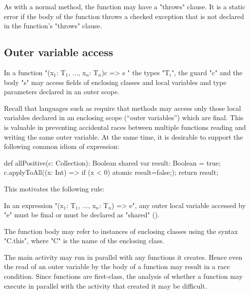 As with a normal method, the function may have a \xcd"throws"
clause. It is a static error if the body of the function throws a
checked exception that is not declared in the function's \xcd"throws"
clause.

\subsection{Outer variable access}

In a function
\xcdmath"(x$_1$: T$_1$, $\dots$, x$_n$: T$_n$){c} => { s }"
the types \xcdmath"T$_i$", the guard \xcd"c" and the body \xcd"s"
may access fields of enclosing classes and local variables and type
parameters declared in an outer scope.

Recall that languages such as \java{} require that methods may
access only those local variables declared in an enclosing scope
(``outer variables'') which are final. This is valuable in
preventing accidental races between multiple functions reading
and writing the same outer variable. At the same time, it is
desirable to support the following common idiom of expression:

\begin{xten}
def allPositive(c: Collection): Boolean {
  shared var result: Boolean = true;
  c.applyToAll((x: Int) => { if (x < 0) atomic {result=false;}});
  return result;
}
\end{xten}

This motivates the following rule:

\begin{staticrule*}
In an expression
\xcdmath"(x$_1$: T$_1$, $\dots$, x$_n$: T$_n$) => e",
any outer local variable accessed by \xcd"e" must be final or
must be declared
as \xcd"shared" ().
\end{staticrule*}

The function body may refer to instances of enclosing classes using
the syntax \xcd"C.this", where \xcd"C" is the name of the
enclosing class.

\begin{note}
The main activity may run in parallel with any
functions it creates. Hence even the read of an outer variable by the
body of a function may result in a race condition. Since functions are
first-class, the analysis of whether a function may execute in parallel
with the activity that created it may be difficult.
\end{note}


